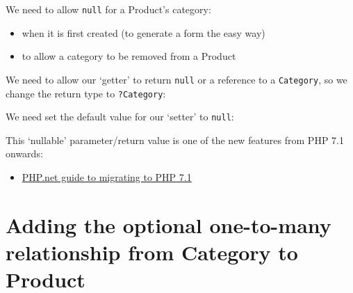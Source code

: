 \documentclass[a4paperpaper,openright]{book}
\newenvironment{Shaded}{}{}
\newcommand{\CommentTok}[1]{\textcolor[rgb]{0.38,0.63,0.69}{\textit{#1}}}
\newcommand{\KeywordTok}[1]{\textcolor[rgb]{0.00,0.44,0.13}{\textbf{#1}}}
\newcommand{\NormalTok}[1]{#1}
\newcommand{\OtherTok}[1]{\textcolor[rgb]{0.00,0.44,0.13}{#1}}
\providecommand{\tightlist}{%
  \setlength{\itemsep}{0pt}\setlength{\parskip}{0pt}}
\begin{document}
We need to allow \texttt{null} for a Product's category:

\begin{itemize}
\item
  when it is first created (to generate a form the easy way)
\item
  to allow a category to be removed from a Product
\end{itemize}

We need to allow our `getter' to return \texttt{null} or a reference to
a \texttt{Category}, so we change the return type to \texttt{?Category}:

\begin{Shaded}
\end{Shaded}

We need set the default value for our `setter' to \texttt{null}:

\begin{Shaded}
\end{Shaded}

This `nullable' parameter/return value is one of the new features from
PHP 7.1 onwards:

\begin{itemize}
\tightlist
\item
  \href{http://php.net/manual/en/migration71.new-features.php}{PHP.net
  guide to migrating to PHP 7.1}
\end{itemize}

\hypertarget{adding-the-optional-one-to-many-relationship-from-category-to-product}{%
\section{Adding the optional one-to-many relationship from Category to
Product}\label{adding-the-optional-one-to-many-relationship-from-category-to-product}}
\end{document}

